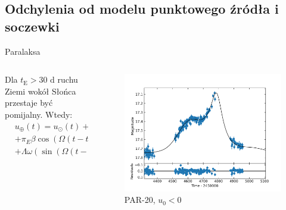 \documentclass{beamer}
\begin{document}
\subsection{Odchylenia od modelu punktowego źródła i soczewki}

\begin{frame}{Paralaksa}
    \begin{columns}
        \begin{column}{0.4\linewidth}
            Dla $t_{\text{E}}>30 \text{ d}$ ruchu Ziemi wokół Słońca przestaje być pomijalny. Wtedy:
            \begin{align*}
                 & u_{\oplus}(t) = u_{\odot}(t)+ \\&+\pi_{E}\beta\cos(\Omega(t-t_0)+\varphi)+\\&+\Lambda \omega(\sin(\Omega(t-t0)+\varphi))
            \end{align*}

        \end{column}

        \begin{column}{0.5\linewidth}
            \begin{figure}
                \centering
                \includegraphics[width = \textwidth]{../sim30/parallax/png/PAR-20-noaver.dat-.png}
                \caption*{\tiny{PAR-20, $u_0<0$}}
            \end{figure}
        \end{column}
    \end{columns}

\end{frame}
\end{document}
